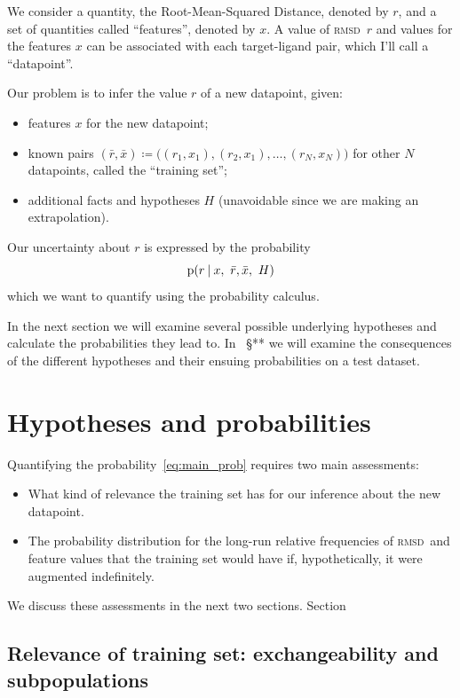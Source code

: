 \documentclass[\ifafour a4paper,12pt,\else a5paper,10pt,\fi%
onecolumn,oneside,article,%
british%
]{memoir}
\theoremstyle{remark}
\theoremstyle{innote}
\newcommand*{\defd}{\coloneqq}
\newcommand*{\p}{\mathrm{p}}%
\renewcommand*{\|}[1][]{\nonscript\:#1\vert\nonscript\:\mathopen{}}
\renewcommand*{\=}{\TextOrMath\texteq\eq}
\newcommand*{\sect}{\S}%
\newcommand*{\wrench}{{\fontencoding{U}\fontfamily{fontawesomethree}\selectfont\symbol{114}}}
\newcommand{\mynote}[1]{ {\color{notecolour}#1}}
\newcommand*{\rmsd}{\textsc{rmsd}}
\newcommand*{\ro}{r}
\newcommand*{\xo}{x}
\newcommand*{\rd}{\bar{r}}
\newcommand*{\xd}{\bar{x}}
\begin{document}
We consider a quantity, the Root-Mean-Squared Distance, denoted by $r$, and
a set of quantities called \enquote{features}, denoted by $x$. A
value of \rmsd\ $r$
and values for the  features $x$ can be associated with each target-ligand
pair, which I'll call a \enquote{datapoint}.

Our problem is to infer the value $\ro$ of a new datapoint, given:
\begin{itemize}
\item features $\xo$ for the new datapoint;
\item known pairs
  $(\rd,\xd) \defd \bigl((r_{1}, x_{1}), (r_{2}, x_{1}), \dotsc, (r_{N},
  x_{N})\bigr)$ for other $N$ datapoints, called the \enquote{training
    set};
\item additional facts and hypotheses $H$ (unavoidable since we are making an
extrapolation).
\end{itemize}

Our uncertainty about $\ro$ is expressed by the probability
\begin{equation}
  \label{eq:main_prob}
  \p(\ro \| \xo,\ \rd,\xd,\ H) 
\end{equation}
which we want to quantify using the probability calculus.

In the next section we will examine several possible underlying hypotheses
and calculate the probabilities they lead to. In \mynote{\wrench\ \sect***}
we will examine the consequences of the different hypotheses and their
ensuing probabilities on a test dataset.


\section{Hypotheses and probabilities}
\label{sec:hypotheses}

Quantifying the probability~\eqref{eq:main_prob} requires two main
assessments:
\begin{itemize}
\item What kind of relevance the training set has for our inference about
  the new datapoint.
\item The probability distribution for the long-run relative frequencies of
  \rmsd\ and feature values that the training set would have if,
  hypothetically, it were augmented indefinitely.
\end{itemize}
We discuss these assessments in the next two sections. Section

\subsection{Relevance of training set: exchangeability and subpopulations}
\label{sec:hyp_exch}
\end{document}
